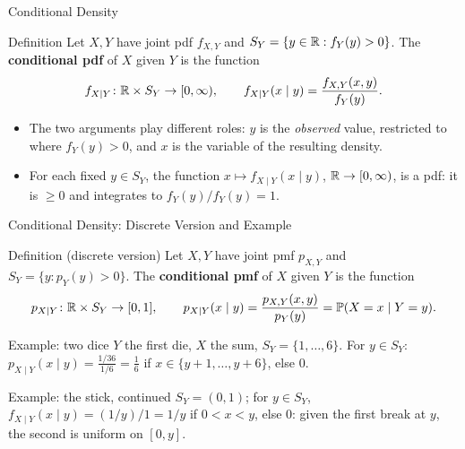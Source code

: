 \begin{frame}{Conditional Density}
  \small
  \begin{block}{Definition}
    Let $X,Y$ have joint pdf $f_{X,Y}$ and $S_Y=\{y\in\mathbb{R} : f_Y(y)>0\}$. The \textbf{conditional pdf} of $X$ given $Y$ is the function
    \[
      f_{X\mid Y}\colon\mathbb{R}\times S_Y\to[0,\infty),\qquad
      f_{X\mid Y}(x\mid y)=\frac{f_{X,Y}(x,y)}{f_Y(y)} .
    \]
  \end{block}
  \begin{itemize}
    \item The two arguments play different roles: $y$ is the \emph{observed} value, restricted to where $f_Y(y)>0$, and $x$ is the variable of the resulting density.
    \item For each fixed $y\in S_Y$, the function $x\mapsto f_{X\mid Y}(x\mid y)$, $\mathbb{R}\to[0,\infty)$, is a pdf: it is $\ge0$ and integrates to $f_Y(y)/f_Y(y)=1$.
  \end{itemize}
\end{frame}

\begin{frame}{Conditional Density: Discrete Version and Example}
  \small
  \begin{block}{Definition (discrete version)}
    Let $X,Y$ have joint pmf $p_{X,Y}$ and $S_Y=\{y : p_Y(y)>0\}$. The \textbf{conditional pmf} of $X$ given $Y$ is the function
    \[
      p_{X\mid Y}\colon\mathbb{R}\times S_Y\to[0,1],\qquad
      p_{X\mid Y}(x\mid y)=\frac{p_{X,Y}(x,y)}{p_Y(y)}=\mathbb{P}(X=x\mid Y=y).
    \]
  \end{block}
  \begin{block}{Example: two dice}
    $Y$ the first die, $X$ the sum, $S_Y=\{1,\dots,6\}$. For $y\in S_Y$: $p_{X\mid Y}(x\mid y)=\frac{1/36}{1/6}=\frac16$ if $x\in\{y+1,\dots,y+6\}$, else $0$.
  \end{block}
  \begin{block}{Example: the stick, continued}
    $S_Y=(0,1)$; for $y\in S_Y$, $f_{X\mid Y}(x\mid y)=(1/y)/1=1/y$ if $0<x<y$, else $0$: given the first break at $y$, the second is uniform on $[0,y]$.
  \end{block}
\end{frame}
